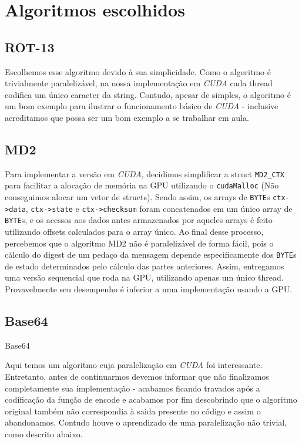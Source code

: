 \documentclass[final,12pt,a4paper]{elsarticle}
\begin{document}
\section{Algoritmos escolhidos}

\subsection{ROT-13}
Escolhemos esse algoritmo devido à sua simplicidade. Como o algoritmo é trivialmente paralelizável, na nossa implementação em  \textit{CUDA} cada thread codifica um único caracter da string. Contudo, apesar de simples, o algoritmo é um bom exemplo para ilustrar o funcionamento básico de  \textit{CUDA} - inclusive acreditamos que possa ser um bom exemplo a se trabalhar em aula.

\subsection{MD2}
Para implementar a versão em \textit{CUDA}, decidimos simplificar a struct \texttt{MD2\_CTX} para facilitar a alocação de memória na GPU utilizando o \texttt{cudaMalloc} (Não conseguimos alocar um vetor de structs). Sendo assim, os arrays de \texttt{BYTE}s \texttt{ctx->data}, \texttt{ctx->state} e \texttt{ctx->checksum} foram concatenados em um único array de \texttt{BYTE}s, e os acessos aos dados antes armazenados por aqueles arrays é feito utilizando offsets calculados para o array único. 
Ao final desse processo, percebemos que o algoritmo MD2 não é paralelizável de forma fácil, pois o cálculo do digest de um pedaço da mensagem depende especificamente dos \texttt{BYTE}s de estado determinados pelo cálculo das partes anteriores. Assim, entregamos uma versão sequencial que roda na GPU, utilizando apenas um único thread. Provavelmente seu desempenho é inferior a uma implementação usando a GPU.

\subsection{Base64}

Base64

Aqui temos um algoritmo cuja paralelização em \textit{CUDA} foi interessante. Entretanto, antes de continuarmos devemos informar que não finalizamos completamente sua implementação - acabamos ficando travados após a codificação da função de encode e acabamos por fim descobrindo que o algoritmo original também não correspondia à saida presente no código e assim o abandonamos. Contudo houve o aprendizado de uma paralelização não trivial, como descrito abaixo.
\end{document}
